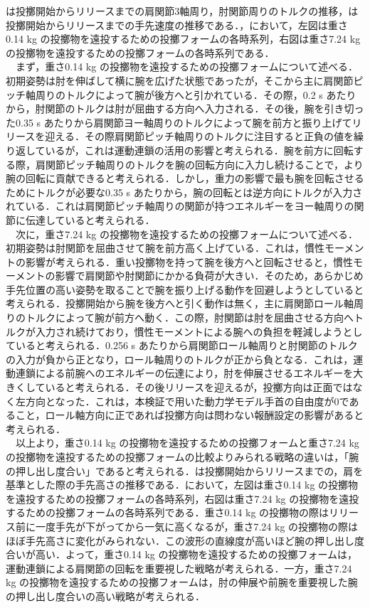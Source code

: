 は投擲開始からリリースまでの肩関節3軸周り，肘関節周りのトルクの推移，は投擲開始からリリースまでの手先速度の推移である．，において，左図は重さ0.14 kg の投擲物を遠投するための投擲フォームの各時系列，右図は重さ7.24 kg の投擲物を遠投するための投擲フォームの各時系列である．\\
　まず，重さ0.14 kg の投擲物を遠投するための投擲フォームについて述べる．初期姿勢は肘を伸ばして横に腕を広げた状態であったが，そこから主に肩関節ピッチ軸周りのトルクによって腕が後方へと引かれている．その際，0.2 s あたりから，肘関節のトルクは肘が屈曲する方向へ入力される．その後，腕を引き切った0.35 s あたりから肩関節ヨー軸周りのトルクによって腕を前方と振り上げてリリースを迎える．その際肩関節ピッチ軸周りのトルクに注目すると正負の値を繰り返しているが，これは運動連鎖の活用の影響と考えられる．腕を前方に回転する際，肩関節ピッチ軸周りのトルクを腕の回転方向に入力し続けることで，より腕の回転に貢献できると考えられる．しかし，重力の影響で最も腕を回転させるためにトルクが必要な0.35 s あたりから，腕の回転とは逆方向にトルクが入力されている．これは肩関節ピッチ軸周りの関節が持つエネルギーをヨー軸周りの関節に伝達していると考えられる．\\
　次に，重さ7.24 kg の投擲物を遠投するための投擲フォームについて述べる．初期姿勢は肘関節を屈曲させて腕を前方高く上げている．これは，慣性モーメントの影響が考えられる．重い投擲物を持って腕を後方へと回転させると，慣性モーメントの影響で肩関節や肘関節にかかる負荷が大きい．そのため，あらかじめ手先位置の高い姿勢を取ることで腕を振り上げる動作を回避しようとしていると考えられる．投擲開始から腕を後方へと引く動作は無く，主に肩関節ロール軸周りのトルクによって腕が前方へ動く．この際，肘関節は肘を屈曲させる方向へトルクが入力され続けており，慣性モーメントによる腕への負担を軽減しようとしていると考えられる．0.256 s あたりから肩関節ロール軸周りと肘関節のトルクの入力が負から正となり，ロール軸周りのトルクが正から負となる．これは，運動連鎖による前腕へのエネルギーの伝達により，肘を伸展させるエネルギーを大きくしていると考えられる．その後リリースを迎えるが，投擲方向は正面ではなく左方向となった．これは，本検証で用いた動力学モデル手首の自由度が0であること，ロール軸方向に正であれば投擲方向は問わない報酬設定の影響があると考えられる．\\
　以上より，重さ0.14 kg の投擲物を遠投するための投擲フォームと重さ7.24 kg の投擲物を遠投するための投擲フォームの比較よりみられる戦略の違いは，「腕の押し出し度合い」であると考えられる．は投擲開始からリリースまでの，肩を基準とした際の手先高さの推移である．において，左図は重さ0.14 kg の投擲物を遠投するための投擲フォームの各時系列，右図は重さ7.24 kg の投擲物を遠投するための投擲フォームの各時系列である．重さ0.14 kg の投擲物の際はリリース前に一度手先が下がってから一気に高くなるが，重さ7.24 kg の投擲物の際はほぼ手先高さに変化がみられない．この波形の直線度が高いほど腕の押し出し度合いが高い．よって，重さ0.14 kg の投擲物を遠投するための投擲フォームは，運動連鎖による肩関節の回転を重要視した戦略が考えられる．一方，重さ7.24 kg の投擲物を遠投するための投擲フォームは，肘の伸展や前腕を重要視した腕の押し出し度合いの高い戦略が考えられる．

